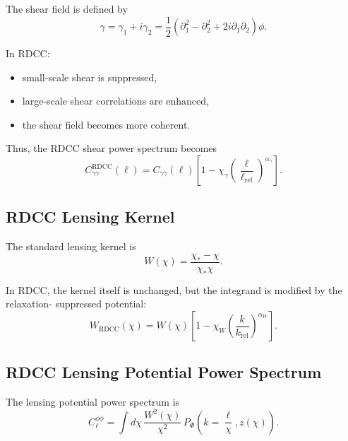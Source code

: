 \documentclass[11pt,a4paper]{article}
\begin{document}
The shear field is defined by
\begin{equation}
\gamma
=
\gamma_{1}
+
i\gamma_{2}
=
\frac{1}{2}
\left(
\partial_{1}^{2}
-
\partial_{2}^{2}
+
2i\partial_{1}\partial_{2}
\right)
\phi.
\end{equation}

In RDCC:
\begin{itemize}
\item small-scale shear is suppressed,
\item large-scale shear correlations are enhanced,
\item the shear field becomes more coherent.
\end{itemize}

Thus, the RDCC shear power spectrum becomes
\begin{equation}
C_{\gamma\gamma}^{\mathrm{RDCC}}(\ell)
=
C_{\gamma\gamma}(\ell)
\left[
1
-
\chi_{\gamma}
\left(
\frac{\ell}{\ell_{\mathrm{rel}}}
\right)^{\alpha_{\gamma}}
\right].
\end{equation}

\subsection{RDCC Lensing Kernel}

The standard lensing kernel is
\begin{equation}
W(\chi)
=
\frac{\chi_{*}-\chi}{\chi_{*}\chi}.
\end{equation}

In RDCC, the kernel itself is unchanged, but the integrand is modified by the relaxation-
suppressed potential:
\begin{equation}
W_{\mathrm{RDCC}}(\chi)
=
W(\chi)
\left[
1
-
\chi_{W}
\left(
\frac{k}{k_{\mathrm{rel}}}
\right)^{\alpha_{W}}
\right].
\end{equation}

\subsection{RDCC Lensing Potential Power Spectrum}

The lensing potential power spectrum is
\begin{equation}
C_{\ell}^{\phi\phi}
=
\int d\chi\,
\frac{W^{2}(\chi)}{\chi^{2}}\,
P_{\Phi}\!\left(k=\frac{\ell}{\chi},z(\chi)\right).
\end{equation}
\end{document}
